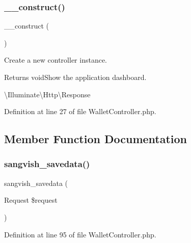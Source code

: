 \subsubsection{\texorpdfstring{\_\_construct()}{\_\_construct()}}
{\footnotesize\ttfamily \+\_\+\+\_\+construct (\begin{DoxyParamCaption}{ }\end{DoxyParamCaption})}

Create a new controller instance.

\begin{DoxyReturn}{Returns}
void\+Show the application dashboard.

\textbackslash{}\+Illuminate\textbackslash{}\+Http\textbackslash{}\+Response 
\end{DoxyReturn}


Definition at line 27 of file Wallet\+Controller.\+php.



\subsection{Member Function Documentation}
\mbox{\label{class_responsive_1_1_http_1_1_controllers_1_1_wallet_controller_a63d8d498a130e9f530dd9de0247a0c74}} 
\subsubsection{\texorpdfstring{sangvish\_savedata()}{sangvish\_savedata()}}
{\footnotesize\ttfamily sangvish\+\_\+savedata (\begin{DoxyParamCaption}\item[{Request}]{\$request }\end{DoxyParamCaption})}



Definition at line 95 of file Wallet\+Controller.\+php.

\mbox{\label{class_responsive_1_1_http_1_1_controllers_1_1_wallet_controller_ae5a8b5289e68974315c61e6e9f0e6494}} 
